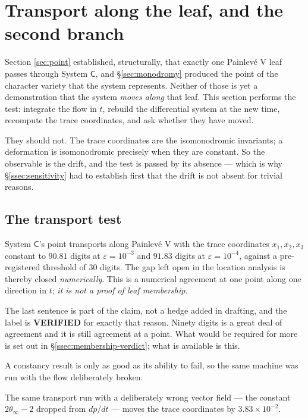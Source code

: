 \section{Transport along the leaf, and the second branch}\label{sec:leaf}

Section \ref{sec:point} established, structurally, that exactly one Painlev\'e
V leaf passes through System $\mathsf C$, and \S\ref{sec:monodromy} produced
the point of the character variety that the system represents. Neither of those
is yet a demonstration that the system \emph{moves along} that leaf. This
section performs the test: integrate the flow in $t$, rebuild the differential
system at the new time, recompute the trace coordinates, and ask whether they
have moved.

They should not. The trace coordinates are the isomonodromic invariants; a
deformation is isomonodromic precisely when they are constant. So the
observable is the drift, and the test is passed by its absence --- which is why
\S\ref{ssec:sensitivity} had to establish first that the drift is not absent
for trivial reasons.

\subsection{The transport test}\label{ssec:transport}

\begin{remark}
System $\mathsf C$'s point transports along Painlev\'e V with the trace
coordinates $x_1,x_2,x_3$ constant to $90.81$ digits at $\varepsilon=10^{-3}$
and $91.83$ digits at $\varepsilon=10^{-4}$, against a pre-registered threshold
of $30$ digits. The gap left open in the location analysis is thereby closed
\emph{numerically}. This is a numerical agreement at one point along one
direction in $t$; \emph{it is not a proof of leaf membership}.
\end{remark}

The last sentence is part of the claim, not a hedge added in drafting, and the
label is \textbf{VERIFIED} for exactly that reason. Ninety digits is a great
deal of agreement and it is still agreement at a point. What would be required
for more is set out in \S\ref{ssec:membership-verdict}; what is available is
this.

A constancy result is only as good as its ability to fail, so the same machine
was run with the flow deliberately broken.

\begin{remark}
The same transport run with a deliberately wrong vector field --- the constant
$2\theta_\infty-2$ dropped from $dp/dt$ --- moves the trace coordinates by
$3.83\times10^{-2}$.
\end{remark}

